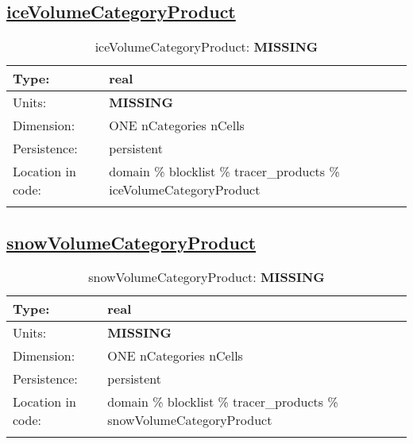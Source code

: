 \subsection[iceVolumeCategoryProduct]{\hyperref[sec:var_tab_tracer_products]{iceVolumeCategoryProduct}}
\label{subsec:var_sec_tracer_products_iceVolumeCategoryProduct}
\begin{center}
\begin{longtable}{| p{2.0in} | p{4.0in} |}
        \hline 
        Type: & real \\
        \hline 
        Units: & {\bf \color{red} MISSING} \\
        \hline 
        Dimension: & ONE nCategories nCells \\
        \hline 
        Persistence: & persistent \\
        \hline 
         Location in code: & domain \% blocklist \% tracer\_products \% iceVolumeCategoryProduct \\
         \hline 
    \caption{iceVolumeCategoryProduct: {\bf \color{red} MISSING}}
\end{longtable}
\end{center}
\subsection[snowVolumeCategoryProduct]{\hyperref[sec:var_tab_tracer_products]{snowVolumeCategoryProduct}}
\label{subsec:var_sec_tracer_products_snowVolumeCategoryProduct}
\begin{center}
\begin{longtable}{| p{2.0in} | p{4.0in} |}
        \hline 
        Type: & real \\
        \hline 
        Units: & {\bf \color{red} MISSING} \\
        \hline 
        Dimension: & ONE nCategories nCells \\
        \hline 
        Persistence: & persistent \\
        \hline 
         Location in code: & domain \% blocklist \% tracer\_products \% snowVolumeCategoryProduct \\
         \hline 
    \caption{snowVolumeCategoryProduct: {\bf \color{red} MISSING}}
\end{longtable}
\end{center}
